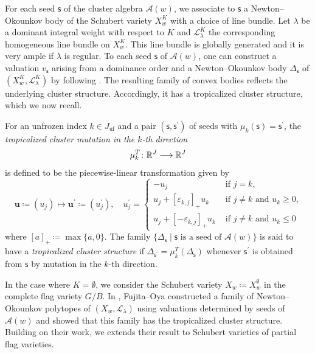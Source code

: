 \documentclass[11pt]{amsart}
\newcommand{\R}{\mathbb{R}}
\numberwithin{equation}{section}
\theoremstyle{plain}
\theoremstyle{definition}
\def\to{\mathchoice{\longrightarrow}{\rightarrow}{\rightarrow}{\rightarrow}}
\numberwithin{equation}{section}
\newcommand{\seed}{\mathsf{s}}
\begin{document}
For each seed $\seed$ of the cluster algebra $\mathcal{A}(w)$, we associate to $\seed$ a Newton--Okounkov body of the Schubert variety $X_w^K$ with a choice of line bundle. Let $\lambda$ be a dominant integral weight with respect to $K$ and $\mathcal{L}^K_\lambda$ the corresponding homogeneous line bundle on $X_w^K$. This line bundle is globally generated and it is very ample if $\lambda$ is regular. To each seed $\seed$ of $\mathcal{A}(w)$, one can construct a valuation $v_\seed$ arising from a dominance order and a Newton–Okounkov body $\Delta_\seed$ of $(X_w^K, \mathcal{L}^K_\lambda)$ by following \cite{Qin17, FO25}. The resulting family of convex bodies reflects the underlying cluster structure. Accordingly, it has a tropicalized cluster structure, which we now recall. 

For an unfrozen index $k \in J_\mathrm{uf}$ and a pair $(\seed, \seed^\prime)$ of seeds with $\mu_k (\seed) = \seed^\prime$, the \emph{tropicalized cluster mutation in the $k$-th direction}
$$
\mu^{{T}}_k \colon \R^{J} \to \R^{J}
$$
is defined to be the piecewise-linear transformation given by 
\begin{equation}\label{equ_tropical11}
\mathbf{u} \coloneqq (u_j) \mapsto \mathbf{u}^\prime \coloneqq (u^\prime_j), \quad 
u_j^\prime = 
\begin{cases}
- u_j &\mbox{ if $j = k$,} \\
u_j + \left[ \varepsilon_{k,j} \right]_+ u_k  &\mbox{ if $j \neq k$ and $u_k \geq 0$,} \\
u_j + \left[ -\varepsilon_{k,j} \right]_+ u_k &\mbox{ if $j \neq k$ and $u_k \leq 0$}
\end{cases}
\end{equation}
where $[a]_+ \coloneqq \max \{a,0\}$. The family $\{\Delta_\seed \mid \mbox{$\seed$ is a seed of $\mathcal{A}(w)$}\}$ is said to have a \emph{tropicalized cluster structure} if $\Delta_{\seed^\prime} = \mu_k^T (\Delta_\seed)$ whenever $\seed^\prime$ is obtained from $\seed$ by mutation in the $k$-th direction.

In the case where $K = \emptyset$, we consider the Schubert variety $X_w \coloneqq X_w^\emptyset$ in the complete flag variety $G/B$. In \cite{FO25}, Fujita--Oya constructed a family of Newton--Okounkov polytopes of $(X_w, \mathcal{L}_\lambda)$ using valuations determined by seeds of $\mathcal{A}(w)$ and showed that this family has the tropicalized cluster structure. Building on their work, we extends their result to Schubert varieties of partial flag varieties. 
\end{document}

